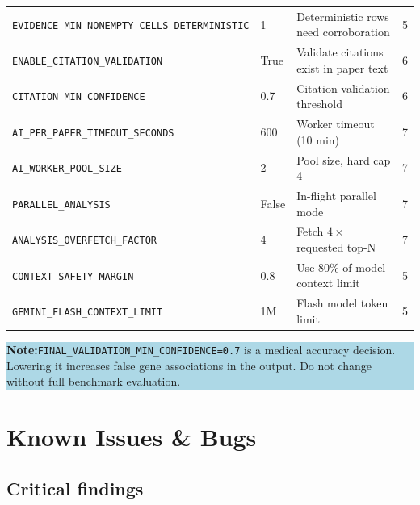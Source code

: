 \documentclass[11pt,a4paper]{article}
\newcommand{\notebox}[1]{%
  \vspace{0.4em}
  \noindent\colorbox{LightBlue}{\parbox{\dimexpr\linewidth-2\fboxsep}{%
    \small\color{NavyBlue}\textbf{Note:}\quad #1}}
  \vspace{0.4em}
}
\begin{document}
\begin{longtable}{llp{4.5cm}l}
\texttt{EVIDENCE\_MIN\_NONEMPTY\_CELLS\_DETERMINISTIC} & 1 & Deterministic rows need corroboration & 5 \\
\texttt{ENABLE\_CITATION\_VALIDATION} & True & Validate citations exist in paper text       & 6 \\
\texttt{CITATION\_MIN\_CONFIDENCE}   & 0.7   & Citation validation threshold                 & 6 \\
\texttt{AI\_PER\_PAPER\_TIMEOUT\_SECONDS} & 600 & Worker timeout (10 min)                  & 7 \\
\texttt{AI\_WORKER\_POOL\_SIZE}      & 2     & Pool size, hard cap 4                         & 7 \\
\texttt{PARALLEL\_ANALYSIS}          & False & In-flight parallel mode                       & 7 \\
\texttt{ANALYSIS\_OVERFETCH\_FACTOR} & 4     & Fetch $4\times$ requested top-N               & 7 \\
\texttt{CONTEXT\_SAFETY\_MARGIN}     & 0.8   & Use 80\% of model context limit               & 5 \\
\texttt{GEMINI\_FLASH\_CONTEXT\_LIMIT} & 1M  & Flash model token limit                       & 5 \\
\end{longtable}

\notebox{\texttt{FINAL\_VALIDATION\_MIN\_CONFIDENCE=0.7} is a medical accuracy decision. Lowering it increases false gene associations in the output. Do not change without full benchmark evaluation.}

\section{Known Issues \& Bugs}

\subsection{Critical findings}
\end{document}
